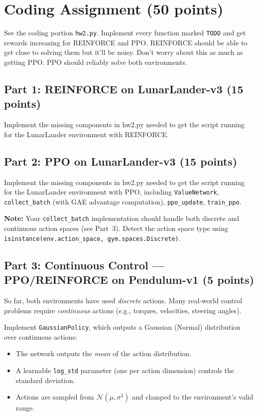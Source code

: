 \documentclass[11pt]{article}
\begin{document}
\section*{Coding Assignment (50 points)}

See the coding portion \texttt{hw2.py}.  Implement every function marked
\texttt{TODO} and get rewards increasing for REINFORCE and PPO. REINFORCE should be able to get close to solving them but it'll be noisy. Don't worry about this as much as getting PPO. PPO should reliably solve both environments.

\subsection*{Part 1: REINFORCE on LunarLander-v3 (15 points)}
Implement the missing components in hw2.py needed to get the script running for the LunarLander environment with REINFORCE.

\subsection*{Part 2: PPO on LunarLander-v3 (15 points)}

Implement the missing components in hw2.py needed to get the script running for the LunarLander environment with PPO, including \texttt{ValueNetwork}, \texttt{collect\_batch} (with GAE
advantage computation), \texttt{ppo\_update}, \texttt{train\_ppo}.

\textbf{Note:} Your \texttt{collect\_batch} implementation should handle
both discrete and continuous action spaces (see Part~3).  Detect the
action space type using
\texttt{isinstance(env.action\_space, gym.spaces.Discrete)}.

\subsection*{Part 3: Continuous Control --- PPO/REINFORCE on Pendulum-v1 (5 points)}

So far, both environments have used \emph{discrete} actions.  Many
real-world control problems require \emph{continuous} actions (e.g.,
torques, velocities, steering angles).

Implement \texttt{GaussianPolicy}, which outputs a Gaussian (Normal)
distribution over continuous actions:
\begin{itemize}
  \item The network outputs the \emph{mean} of the action distribution.
  \item A learnable \texttt{log\_std} parameter (one per action dimension)
        controls the standard deviation.
  \item Actions are sampled from $\mathcal{N}(\mu, \sigma^2)$ and clamped
        to the environment's valid range.
\end{itemize}
\end{document}
